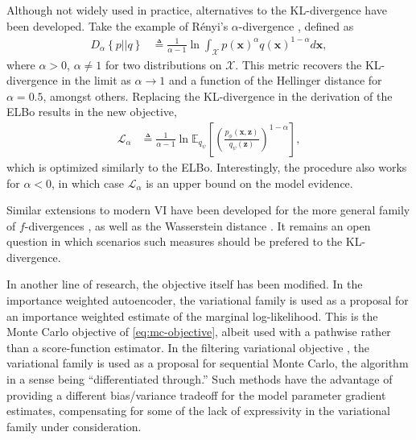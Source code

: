 Although not widely used in practice, alternatives to the KL-divergence have been developed. Take the example of R\'enyi's $\alpha$-divergence \citep{LiTurner2016}, defined as
\begin{align*}
	D_\alpha\left\{p||q\right\} &\triangleq \frac{1}{\alpha-1}\ln\int_\mathcal{X}p(\mathbf{x})^\alpha q(\mathbf{x})^{1-\alpha}d\mathbf{x},
\end{align*}
where $\alpha>0$, $\alpha\neq1$ for two distributions on $\mathcal{X}$. This metric recovers the KL-divergence in the limit as $\alpha\rightarrow1$ and a function of the Hellinger distance for $\alpha=0.5$, amongst others. Replacing the KL-divergence in the derivation of the ELBo results in the new objective,
\begin{align*}
	\mathcal{L}_\alpha &\triangleq \frac{1}{\alpha-1}\ln\mathbb{E}_{q_\psi}\left[\left(\frac{p_\phi(\mathbf{x},\mathbf{z})}{q_\psi(\mathbf{z})}\right)^{1-\alpha}\right], 
\end{align*}
which is optimized similarly to the ELBo. Interestingly, the procedure also works for $\alpha<0$, in which case $\mathcal{L}_\alpha$ is an upper bound on the model evidence.

Similar extensions to modern VI have been developed for the more general family of $f$-divergences \citep{bamler2017perturbative}, as well as the Wasserstein distance \citep{ranganath2016operator, liu2016stein}. It remains an open question in which scenarios such measures should be prefered to the KL-divergence.

In another line of research, the objective itself has been modified. In the importance weighted autoencoder, the variational family is used as a proposal for an importance weighted estimate of the marginal log-likelihood. This is the Monte Carlo objective of \eqref{eq:mc-objective}, albeit used with a pathwise rather than a score-function estimator. In the filtering variational objective \citep{MaddisonEtAl2017, LeEtAl2017, NaessethEtAl2017}, the variational family is used as a proposal for sequential Monte Carlo, the algorithm in a sense being ``differentiated through.'' Such methods have the advantage of providing a different bias/variance tradeoff for the model parameter gradient estimates, compensating for some of the lack of expressivity in the variational family under consideration.

